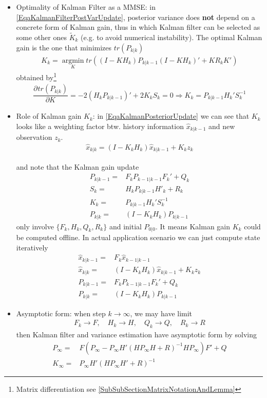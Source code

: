 \begin{itemize}[topsep=2pt,itemsep=0pt]
    \item Optimality of Kalman Filter as a MMSE: in \autoref{EqaKalmanFilterPostVarUpdate}, posterior variance does \textbf{not} depend on a concrete form of Kalman gain, thus in which Kalman filter  can be selected as some other ones $ \tilde{K}_k $ (e.g. to avoid numerical instability). The optimal Kalman gain is the one that minimizes $ tr\left(P_{k|k}\right) $
    \begin{align*}
        K_k=\mathop{\arg\min}\limits_{K}tr\left( (I-KH_k)P_{k|k-1}(I-KH_k)'+KR_kK' \right)
    \end{align*}
    obtained by\footnote{Matrix differentiation see \autoref{SubSubSectionMatrixNotationAndLemma}}
    \begin{align*}
        \dfrac{\partial^{} tr\left(P_{k|k}\right)}{\partial K ^{}}= -2\left(H_kP_{k|k-1}\right)'+2K_kS_k=0\Rightarrow K_k=P_{k|k-1}H_k'S_k^{-1}
    \end{align*}

    \item Role of Kalman gain $ K_k $: in \autoref{EqaKalmanPosteriorUpdate} we can see that $ K_k $ looks like a weighting factor btw. history information $ \hat{x}_{k|k-1} $ and new observation $ z_k $.
    \begin{align*}
        \hat{x}_{k|k}=\left(I-K_kH_k\right)\hat{x}_{k|k-1}+K_kz_k 
    \end{align*}

    and note that the Kalman gain update
    \begin{align*}
        P_{k|k-1}=&F_kP_{k-1|k-1}F_k'+Q_k\\
        S_k=&H_kP_{k|k-1}H'_k+R_k\\
        K_k=&P_{k|k-1}H_k'S_k^{-1}\\
        P_{k|k}=&(I-K_kH_k)P_{k|k-1}
    \end{align*}
    only involve $ \{F_k,H_k,Q_k,R_k\} $ and initial $ P_{0|0}$. It means Kalman gain $ K_k $ could be computed offline. In actual application scenario we can just compute state iteratively
    \begin{align*}
        \hat{x}_{k|k-1}=&F_k\hat{x}_{k-1|k-1}\\
        \hat{x}_{k|k}=&\left(I-K_kH_k\right)\hat{x}_{k|k-1}+K_kz_k\\
        P_{k|k-1}=&F_kP_{k-1|k-1}F_k'+Q_k\\
        P_{k|k}=&\left(I-K_kH_k\right)P_{k|k-1}
    \end{align*}
    \item Asymptotic form: when step $ k\to\infty $, we may have limit
    \begin{align*}
        F_k\to F ,\quad H_k\to H,\quad Q_k\to Q ,\quad R_k\to R 
    \end{align*}
    then Kalman filter and variance estimation have asymptotic form by solving
    \begin{align*}
        P_{\infty}=&F \left(P_\infty-P_\infty H'\left(H P_\infty H
        +R \right)^{-1}H P_\infty\right)F '+Q \\
        K_\infty = &P_\infty H '\left(H P_\infty H '+R\right)^{-1}
    \end{align*}


\end{itemize}
